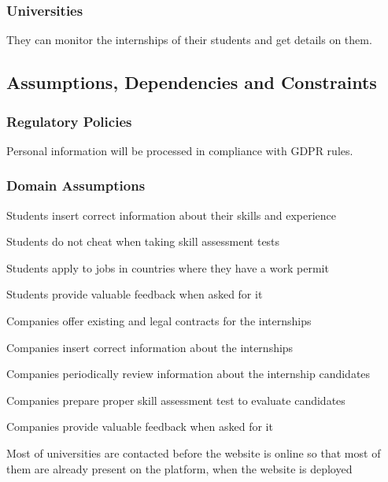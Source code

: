 \subsubsection{Universities}
    They can monitor the internships of their students and get details on them.
\subsection{Assumptions, Dependencies and Constraints}



\subsubsection{Regulatory Policies}
    Personal information will be processed in compliance with GDPR rules.


\subsubsection{Domain Assumptions}
    \begin{enumerate}[label={[D\arabic*]}]
        \item {Students insert correct information about their skills and experience}
        \item {Students do not cheat when taking skill assessment tests}
        \item {Students apply to jobs in countries where they have a work permit}
        \item {Students provide valuable feedback when asked for it}
        \item {Companies offer existing and legal contracts for the internships}
        \item {Companies insert correct information about the internships}
        \item {Companies periodically review information about the internship candidates}
        \item {Companies prepare proper skill assessment test to evaluate candidates}
        \item {Companies provide valuable feedback when asked for it}
        \item {Most of universities are contacted before the website is online so that most of them are already present on the platform, when the website is deployed}
    \end{enumerate}